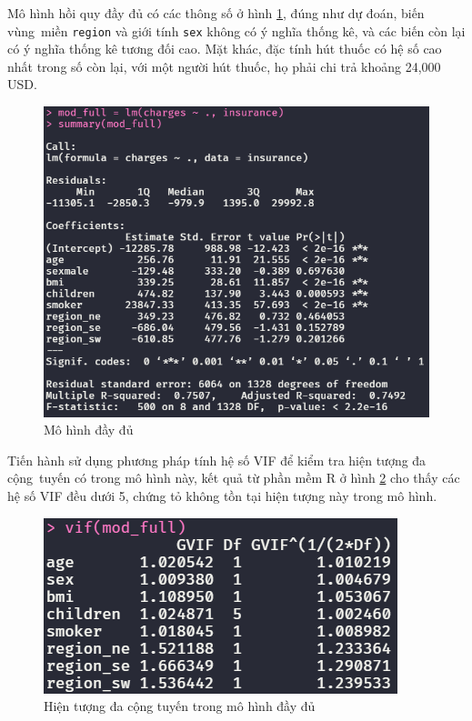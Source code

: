 Mô hình hồi quy đầy đủ có các thông số ở hình \ref{fig-a1:model-full}, đúng như dự đoán, biến vùng~miền \texttt{region} và giới tính \texttt{sex} không có ý nghĩa thống kê, và các biến còn lại có ý nghĩa thống kê tương đối cao. Mặt khác, đặc tính hút thuốc có hệ số cao nhất trong số còn lại, với một người hút thuốc, họ phải chi trả khoảng 24,000 USD.
\begin{figure}[H]
	\centering
	\includegraphics[width=0.7\linewidth]{images/A1/model-full}
	\caption{Mô hình đầy đủ}
	\label{fig-a1:model-full}
\end{figure}

Tiến hành sử dụng phương pháp tính hệ số VIF để kiểm tra hiện tượng đa cộng~tuyến có trong mô hình này, kết quả từ phần mềm R ở hình \ref{fig-a1:model-full-vif} cho thấy các hệ số VIF đều dưới 5, chứng tỏ không tồn tại hiện tượng này trong mô hình.
\begin{figure}[H]
	\centering
	\includegraphics[width=0.5\linewidth]{images/A1/model-full-vif}
	\caption{Hiện tượng đa cộng tuyến trong mô hình đầy đủ}
	\label{fig-a1:model-full-vif}
\end{figure}

